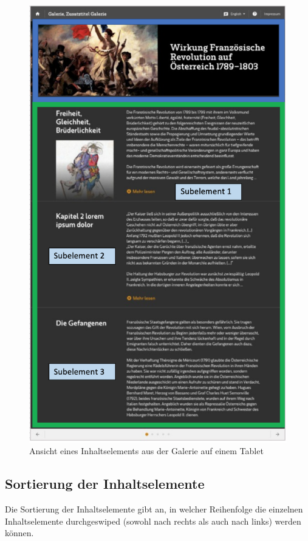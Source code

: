 \begin{figure}[ht!]
\centering
\includegraphics[width=12cm]{Figures/paula/galerie/ansicht_inhaltselement_galerie.png}
\caption{Ansicht eines Inhaltselements aus der Galerie auf einem Tablet}
\label{img:ansicht_inhaltselement_galerie}
\end{figure}

\subsection{Sortierung der Inhaltselemente}

Die Sortierung der Inhaltselemente gibt an, in welcher Reihenfolge die einzelnen Inhaltselemente durchgeswiped (sowohl nach rechts als auch nach links) werden können.


